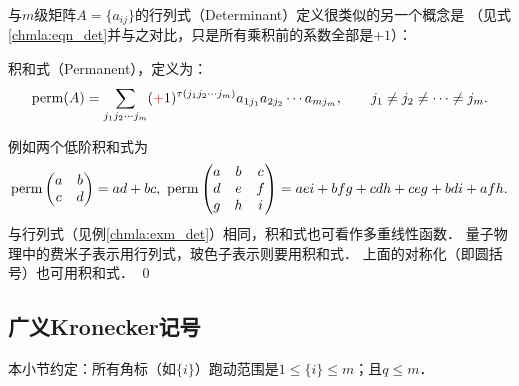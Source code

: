 
与$m$级矩阵$A=\{a_{ij}\}$的行列式（Determinant）定义很类似的另一个概念是
（见式\eqref{chmla:eqn_det}并与之对比，只是所有{\kaishu 乘积}前的系数全部是$+1$）：
\begin{example}\label{chmla:exm_permanent}
{\heiti 积和式}（Permanent），定义为：
\begin{equation*} %
    {\rm perm} (A) = \sum_{j_1 j_2\cdots j_m} ({\color{red}+}1)^{\tau(j_1 j_2 \cdots j_m)}
    a_{1 j_1} a_{2 j_2}\cdots a_{m j_m} , \qquad
    j_1 \neq j_2 \neq \cdots \neq j_m .
\end{equation*}
\end{example}
例如两个低阶积和式为
\begin{equation*}
    {\rm perm}\begin{pmatrix}a&b \\ c&d\end{pmatrix}=ad+bc, \
    {\rm perm}\begin{pmatrix}a&b&c \\ d&e&f \\ g&h&i \end{pmatrix}=aei + bfg + cdh + ceg + bdi + afh.
\end{equation*}
与行列式（见例\ref{chmla:exm_det}）相同，积和式也可看作多重线性函数．
量子物理中的费米子表示用行列式，玻色子表示则要用{\kaishu 积和式}．
上面的对称化（即圆括号）也可用积和式． \qed

\subsection{广义Kronecker记号}\label{chmla:sec_asym}

本小节约定：所有角标（如$\{i\}$）跑动范围是$1 \leqslant \{i\} \leqslant m$；且$q \leqslant m$．



